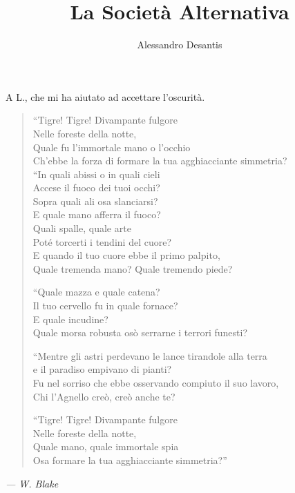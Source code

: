 \documentclass[a4paper,12pt]{book}
\title{La Società Alternativa}
\author{Alessandro Desantis}
\newenvironment{dedication}
{
    \thispagestyle{empty}
    \begin{flushright}
}%
{
    \end{flushright}
}
\begin{document}
\maketitle

\begin{dedication}
A L., che mi ha aiutato ad accettare l'oscurità.
\end{dedication}

\clearpage

\begin{verse}
\itshape{
``Tigre! Tigre! Divampante fulgore\\
Nelle foreste della notte,\\
Quale fu l'immortale mano o l'occhio\\
Ch'ebbe la forza di formare la tua agghiacciante simmetria?\\

``In quali abissi o in quali cieli\\
Accese il fuoco dei tuoi occhi?\\
Sopra quali ali osa slanciarsi?\\
E quale mano afferra il fuoco?\\
Quali spalle, quale arte\\
Poté torcerti i tendini del cuore?\\
E quando il tuo cuore ebbe il primo palpito,\\
Quale tremenda mano? Quale tremendo piede?

``Quale mazza e quale catena?\\
Il tuo cervello fu in quale fornace?\\
E quale incudine?\\
Quale morsa robusta osò serrarne i terrori funesti?

``Mentre gli astri perdevano le lance tirandole alla terra\\
e il paradiso empivano di pianti?\\
Fu nel sorriso che ebbe osservando compiuto il suo lavoro,\\
Chi l'Agnello creò, creò anche te?

``Tigre! Tigre! Divampante fulgore\\
Nelle foreste della notte,\\
Quale mano, quale immortale spia\\
Osa formare la tua agghiacciante simmetria?''
\/}
\end{verse}
\begin{flushright}
\emph{--- W. Blake}
\end{flushright}
\end{document}
